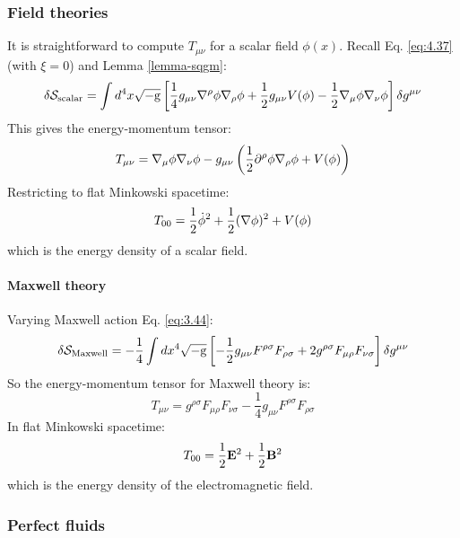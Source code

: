\subsubsection{Field theories}

It is straightforward to compute $ T_{\mu \nu} $ for a scalar field $ \phi(x) $. Recall Eq. \ref{eq:4.37} (with $ \xi = 0 $) and Lemma \ref{lemma-sqgm}:
\begin{equation*}
  \delta \mathcal{S}_{\text{scalar}} = \int d^4 x \sqrt{-\mathrm{g}} \left[ \frac{1}{4} g_{\mu \nu} \nabla^\rho \phi \nabla_\rho \phi + \frac{1}{2} g_{\mu \nu} V(\phi) - \frac{1}{2} \nabla_\mu \phi \nabla_\nu \phi \right] \delta g^{\mu \nu}
\end{equation*}
This gives the energy-momentum tensor:
\begin{equation}
  T_{\mu \nu} = \nabla_\mu \phi \nabla_\nu \phi - g_{\mu \nu} \left( \frac{1}{2} \partial^\rho \phi \nabla_\rho \phi + V(\phi) \right)
  \label{eq:4.44}
\end{equation}
Restricting to flat Minkowski spacetime:
\begin{equation*}
  T_{00} = \frac{1}{2} \dot{\phi}^2 + \frac{1}{2} (\nabla \phi)^2 + V(\phi)
\end{equation*}
which is the energy density of a scalar field.

\paragraph{Maxwell theory}

Varying Maxwell action Eq. \ref{eq:3.44}:
\begin{equation*}
  \delta \mathcal{S}_{\text{Maxwell}} = - \frac{1}{4} \int dx^4 \sqrt{-\mathrm{g}} \left[ - \frac{1}{2} g_{\mu \nu} F^{\rho \sigma} F_{\rho \sigma} + 2 g^{\rho \sigma} F_{\mu \rho} F_{\nu \sigma} \right] \delta g^{\mu \nu}
\end{equation*}
So the energy-momentum tensor for Maxwell theory is:
\begin{equation}
  T_{\mu \nu} = g^{\rho \sigma} F_{\mu \rho} F_{\nu \sigma} - \frac{1}{4} g_{\mu \nu} F^{\rho \sigma} F_{\rho \sigma}
  \label{eq:4.45}
\end{equation}
In flat Minkowski spacetime:
\begin{equation*}
  T_{00} = \frac{1}{2} \mathbf{E}^2 + \frac{1}{2} \mathbf{B}^2
\end{equation*}
which is the energy density of the electromagnetic field.

\subsubsection{Perfect fluids}

